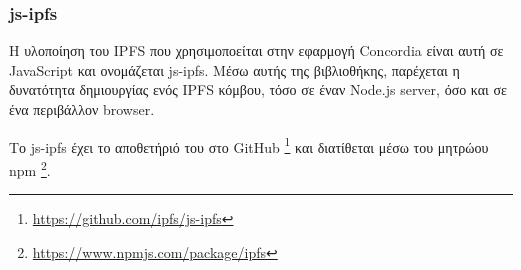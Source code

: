 \subsubsection{js-ipfs} \label{subsection:4-2-4-1-js-ipfs}


H υλοποίηση του IPFS που χρησιμοποείται στην εφαρμογή Concordia είναι αυτή σε JavaScript και ονομάζεται js-ipfs. Μέσω αυτής της βιβλιοθήκης, παρέχεται η δυνατότητα δημιουργίας ενός IPFS κόμβου, τόσο σε έναν Node.js server, όσο και σε ένα περιβάλλον browser.

Το js-ipfs έχει το αποθετήριό του στο GitHub \footnote{\url{https://github.com/ipfs/js-ipfs}} και διατίθεται μέσω του μητρώου npm \footnote{\url{https://www.npmjs.com/package/ipfs}}.
